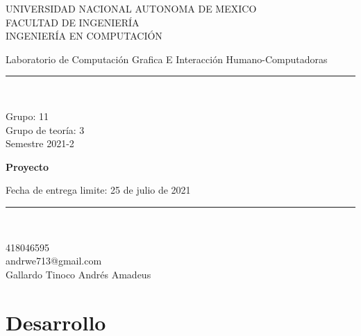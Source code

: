 \documentclass[letter,12pt]{article}
\begin{document}
\begin{titlepage}
	
	\begin{center}
		\vspace*{-1in}

		
		UNIVERSIDAD NACIONAL AUTONOMA DE MEXICO\\
		\vspace*{0.15in}
		FACULTAD DE INGENIERÍA \\
		\vspace*{0.15in}
		INGENIERÍA EN COMPUTACIÓN \\
		\vspace*{0.6in}
		\begin{large}
			Laboratorio de Computación Grafica E Interacción Humano-Computadoras\\
		\end{large}
		\vspace*{0.1in}
		\rule{160mm}{0.1mm}\\
		\vspace*{0.1in}
		\begin{large}
			Grupo: 11\\
			Grupo de teoría: 3\\
			Semestre 2021-2\\
		\end{large}
		\vspace*{0.2in}
		\begin{Large}
			\textbf{Proyecto } \\
		\end{Large}
		\vspace*{0.2in}
		\begin{large}
			Fecha de entrega limite: 25 de julio de 2021\\
		\end{large}
		\vspace*{0.3in}
		\rule{80mm}{0.1mm}\\
		\vspace*{0.1in}
		\begin{large}
			418046595 \\
			andrwe713@gmail.com \\
			Gallardo Tinoco Andrés Amadeus\\
		\end{large}
	\end{center}
	
\end{titlepage}
\newpage
\section{Desarrollo}
\end{document}
